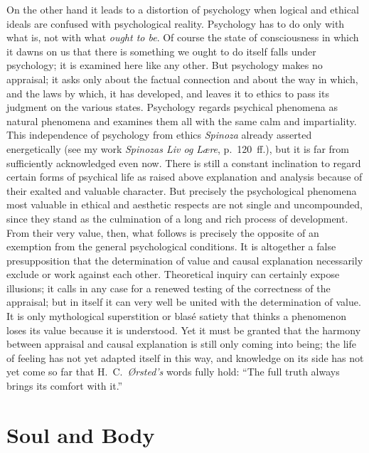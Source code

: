 \documentclass[12pt,a4paper]{book}
\newcommand{\opage}[1]{\marginnote{\footnotesize\textit{[#1]}}}
\begin{document}
On the other hand it leads to a distortion of psychology when logical and
ethical ideals are confused with psychological reality. Psychology has to
do only with what is, not with what \emph{ought to be}. Of course the
state of consciousness in which it dawns on us that there is something
we ought to do itself falls under psychology; it is examined here like
any other. But psychology makes no appraisal; it asks only about the
factual connection and about the way in which, and the laws by which, it
has developed, and leaves it to ethics to pass its judgment on the
various states. Psychology regards psychical phenomena as natural
phenomena and examines them all with the same calm and impartiality. This
independence of psychology from ethics \emph{Spinoza} already asserted
energetically (see my work \textit{Spinozas Liv og Lære}, p.~120~ff.),
but it is far from sufficiently acknowledged even now. There is still a
constant inclination to regard certain forms of psychical life as raised
above explanation and analysis because of their exalted and valuable
character. But precisely the psychological phenomena most valuable in
ethical and aesthetic respects are not single and uncompounded, since they
stand as the culmination of a long and rich process of development. From
their very value, then, what follows is precisely the opposite of an
exemption from the general psychological conditions. It is altogether a
false presupposition that the determination of value and causal
explanation necessarily exclude or work against each other. Theoretical
inquiry can
\opage{35}certainly expose illusions; it calls in any case for a renewed
testing of the correctness of the appraisal; but in itself it can very
well be united with the determination of value. It is only mythological
superstition or blasé satiety that thinks a phenomenon loses its value
because it is understood. Yet it must be granted that the harmony between
appraisal and causal explanation is still only coming into being; the
life of feeling has not yet adapted itself in this way, and knowledge on
its side has not yet come so far that H.~C.~\emph{Ørsted's} words fully
hold: ``The full truth always brings its comfort with it.''


\chapter[Soul and Body]{Soul and Body\opage{36}}
\end{document}
